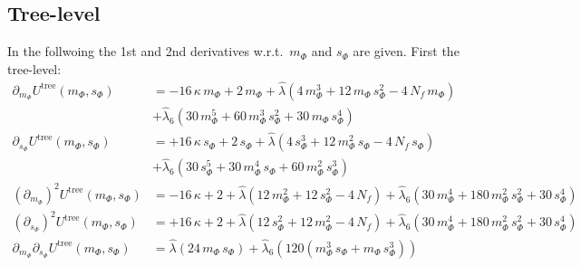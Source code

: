 \subsection*{Tree-level}
In the follwoing the 1st and 2nd derivatives w.r.t.\ $m_{\Phi}$ and $s_{\Phi}$ are given. First the tree-level:
\begin{align}\label{CEP_derivative_dm_treeLevel}
 \partial_{m_{\Phi}} U^{\text{tree}}(m_{\Phi}, s_{\Phi})&=
                    -16 \,\kappa\, m_{\Phi} + 2\, m_{\Phi} + \hat\lambda \left( 4\, m_{\Phi}^3 + 12 \,m_{\Phi} \, s_{\Phi}^2 - 4\, N_f\, m_{\Phi} \right)
                    \nonumber \\
                    & + \hat\lambda_6\left( 30\, m_{\Phi}^5 + 60\, m_{\Phi}^3\, s_{\Phi}^2 + 30\, m_{\Phi}\, s_{\Phi}^4 \right)
                    \\ \label{eq:CEP_derivative_ds_treeLevel}
 \partial_{s_{\Phi}}   U^{\text{tree}}(m_{\Phi}, s_{\Phi})&=
                    +16 \,\kappa\, s_{\Phi} + 2\, s_{\Phi} + \hat\lambda \left( 4\, s_{\Phi}^3 + 12\, m_{\Phi}^2\, s_{\Phi} -4\, N_f\, s_{\Phi} \right)
                    \nonumber \\
                    & + \hat\lambda_6\left( 30\, s_{\Phi}^5 + 30\, m_{\Phi}^4\, s_{\Phi} + 60\, m_{\Phi}^2\, s_{\Phi}^3 \right)
                    \\ \label{eq:CEP_derivative_dmdm_treeLevel}
 \left(\partial_{m_{\Phi}}\right)^2   U^{\text{tree}}(m_{\Phi}, s_{\Phi})&=
                    -16\, \kappa  + 2 + \hat\lambda \left( 12\, m_{\Phi}^2 + 12\, s_{\Phi}^2 - 4\, N_f \right)
                    + \hat\lambda_6 \left( 30\, m_{\Phi}^4 + 180\, m_{\Phi}^2\, s_{\Phi}^2 + 30\, s_{\Phi}^4 \right)
                    \\ \label{eq:CEP_derivative_dsds_treeLevel}
 \left(\partial_{s_{\Phi}} \right)^2  U^{\text{tree}}(m_{\Phi}, s_{\Phi})&=
                    +16\, \kappa  + 2 + \hat\lambda \left( 12\, s_{\Phi}^2 + 12\, m_{\Phi}^2 - 4\, N_f \right)
                    + \hat\lambda_6 \left( 30\, m_{\Phi}^4 + 180\, m_{\Phi}^2\, s_{\Phi}^2 + 30\, s_{\Phi}^4 \right)
 \\ \label{eq:CEP_derivative_dmds_treeLevel}
 \partial_{m_{\Phi}} \partial_{s_{\Phi}}   U^{\text{tree}}(m_{\Phi}, s_{\Phi})&=
                    \hat\lambda \left( 24\, m_{\Phi}\, s_{\Phi} \right) 
                    + \hat\lambda_6 \left( 120 \left( m_{\Phi}^3\, s_{\Phi} + m_{\Phi}\, s_{\Phi}^3 \right) \right)
\end{align}
% 
% 

